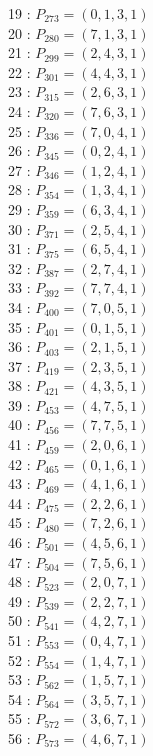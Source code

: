 \documentclass{article}
\begin{document}
{\begin{multicols}{2}
19 : $P_{273}=( 0, 1, 3, 1 )$\\
20 : $P_{280}=( 7, 1, 3, 1 )$\\
21 : $P_{299}=( 2, 4, 3, 1 )$\\
22 : $P_{301}=( 4, 4, 3, 1 )$\\
23 : $P_{315}=( 2, 6, 3, 1 )$\\
24 : $P_{320}=( 7, 6, 3, 1 )$\\
25 : $P_{336}=( 7, 0, 4, 1 )$\\
26 : $P_{345}=( 0, 2, 4, 1 )$\\
27 : $P_{346}=( 1, 2, 4, 1 )$\\
28 : $P_{354}=( 1, 3, 4, 1 )$\\
29 : $P_{359}=( 6, 3, 4, 1 )$\\
30 : $P_{371}=( 2, 5, 4, 1 )$\\
31 : $P_{375}=( 6, 5, 4, 1 )$\\
32 : $P_{387}=( 2, 7, 4, 1 )$\\
33 : $P_{392}=( 7, 7, 4, 1 )$\\
34 : $P_{400}=( 7, 0, 5, 1 )$\\
35 : $P_{401}=( 0, 1, 5, 1 )$\\
36 : $P_{403}=( 2, 1, 5, 1 )$\\
37 : $P_{419}=( 2, 3, 5, 1 )$\\
38 : $P_{421}=( 4, 3, 5, 1 )$\\
39 : $P_{453}=( 4, 7, 5, 1 )$\\
40 : $P_{456}=( 7, 7, 5, 1 )$\\
41 : $P_{459}=( 2, 0, 6, 1 )$\\
42 : $P_{465}=( 0, 1, 6, 1 )$\\
43 : $P_{469}=( 4, 1, 6, 1 )$\\
44 : $P_{475}=( 2, 2, 6, 1 )$\\
45 : $P_{480}=( 7, 2, 6, 1 )$\\
46 : $P_{501}=( 4, 5, 6, 1 )$\\
47 : $P_{504}=( 7, 5, 6, 1 )$\\
48 : $P_{523}=( 2, 0, 7, 1 )$\\
49 : $P_{539}=( 2, 2, 7, 1 )$\\
50 : $P_{541}=( 4, 2, 7, 1 )$\\
51 : $P_{553}=( 0, 4, 7, 1 )$\\
52 : $P_{554}=( 1, 4, 7, 1 )$\\
53 : $P_{562}=( 1, 5, 7, 1 )$\\
54 : $P_{564}=( 3, 5, 7, 1 )$\\
55 : $P_{572}=( 3, 6, 7, 1 )$\\
56 : $P_{573}=( 4, 6, 7, 1 )$\\
\end{multicols}
}
\end{document}

